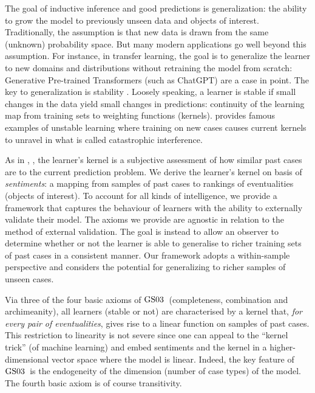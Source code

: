 \documentclass[ecta,nameyear,draft]{econsocart}
\newcommand{\gsii}{$\textup{GS03}$}
\theoremstyle{plain}
\theoremstyle{remark}
\begin{document}
The goal of inductive inference and good predictions is generalization: the
ability to grow the model to previously unseen data and objects of interest.
Traditionally, the assumption is that new data is drawn from the same (unknown)
probability space.
But many modern applications go well beyond this assumption.
For instance, in transfer learning, the goal is to generalize the learner to
new domains and distributions without retraining the model from scratch:
Generative Pre-trained Transformers (such as ChatGPT) are a case in point.
The key to generalization is stability \citep{bousquet2002stability,poggio2004general,mukherjee2006learning}.
Loosely speaking, a learner is stable if small changes in the data yield small changes in predictions: continuity of the learning map from training sets to weighting functions (kernels).
\cite{mccloskey1989catastrophic} provides famous examples of unstable learning where training on new cases causes current kernels to unravel in what is called catastrophic interference.

As in \citet[henceforth, \gsii]{gilboa2003inductive},
\citet{billot2005probabilities,gilboa2006empirical,argenziano2019second}, the
learner's kernel is a subjective assessment of how similar past cases are to
the current prediction problem.  We derive the learner's kernel on basis of
\emph{sentiments}: a mapping from samples of past cases to rankings of
eventualities (objects of interest).
To account for all kinds of
intelligence, we provide a framework that captures the behaviour of learners
with the ability to externally validate their model.
The axioms we provide are
agnostic in relation to the method of external validation. The goal is instead
to allow an observer to determine whether or not the learner is able to
generalise to richer training sets of past cases in a consistent manner. Our
framework adopts a within-sample perspective \citep[page 7, experiment
1]{chervonenkis2015recollections} and considers the potential for generalizing
to richer samples of unseen cases.

Via three of the four basic axioms of \gsii\ (completeness, combination and
archimeanity), all learners (stable or not) are characterised by a kernel that,
\emph{for every pair of eventualities}, gives rise to a linear function on
samples of past cases. This restriction to linearity is not severe since one
can appeal to the ``kernel trick'' (of machine learning) and embed sentiments
and the kernel in a higher-dimensional vector space where the model is linear.
Indeed, the key feature of \gsii\ is the endogeneity of the dimension (number
of case types) of the model. The fourth basic axiom is of course transitivity.
\end{document}

